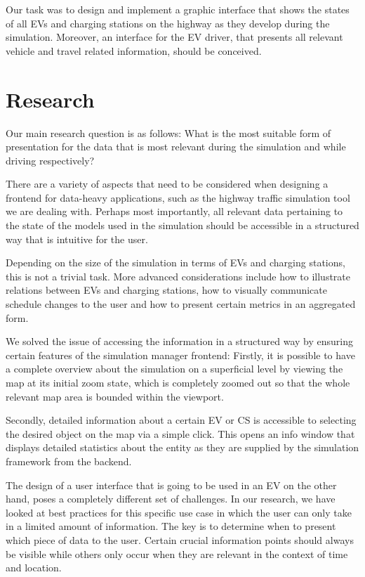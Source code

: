 Our task was to design and implement a graphic interface that shows the states of all EVs and charging stations on
the highway as they develop during the simulation. Moreover, an interface for the EV driver, that presents all
relevant vehicle and travel related information, should be conceived.


\section{Research}

Our main research question is as follows: What is the most suitable form of presentation for the data that is most
relevant during the simulation and while driving respectively?

There are a variety of aspects that need to be considered when designing a frontend for data-heavy applications,
such as the highway traffic simulation tool we are dealing with. Perhaps most importantly, all relevant data
pertaining to the state of the models used in the simulation should be accessible in a structured way that is intuitive
for the user.

Depending on the size of the simulation in terms of EVs and charging stations, this is not a trivial
task. More advanced considerations include how to illustrate relations between EVs and charging stations, how to
visually communicate schedule changes to the user and how to present certain metrics in an aggregated form.

We solved the issue of accessing the information in a structured way by ensuring certain features of the simulation manager frontend: Firstly, it is possible to have a complete overview about the simulation on a superficial level by viewing the map at its initial zoom state, which is completely zoomed out so that the whole relevant map area is bounded within the viewport.

Secondly, detailed information about a certain EV or CS is accessible to selecting the desired object on the map via a simple click. This opens an info window that displays detailed statistics about the entity as they are supplied by the simulation framework from the backend.

The design of a user interface that is going to be used in an EV on the other hand, poses a completely different set
of challenges. In our research, we have looked at best practices for this specific use case in which the user
can only take in a limited amount of information. The key is to determine when to present which piece of
data to the user. Certain crucial information points should always be visible while others only occur
when they are relevant in the context of time and location.

